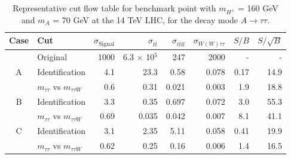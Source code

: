 \begin{table}
\centering
\begin{adjustwidth*}{0in}{-0.8in}
\caption{Representative cut flow table for benchmark point with $m_{H^{\pm}}$ = 160 GeV and $m_A$ = 70 GeV at the 14 TeV LHC, for the decay mode $A\rightarrow\tau\tau$.}
\begin{tabular}{clrrrrrr}
  \toprule
  Case    & Cut                                & $\sigma_\text{Signal}$ & $\sigma_{t\bar{t}}$ & $\sigma_{t\bar{t}ll}$ & $\sigma_{W(W)\tau\tau}$ & $S/B$ & $S/\sqrt{B}$	\\\midrule
          & Original                           & 1000                   & 6.3 $\times$ 10$^5$ & 247                   & 2000                    & -     & - \\\midrule
  A       & Identification                     & 4.1                    & 23.3                & 0.58                  & 0.078                   & 0.17  & 14.9		\\
          & $m_{\tau\tau}$ vs $m_{\tau\tau W}$ & 0.6                    & 0.31                & 0.021                 & 0.003                   & 1.9   & 18.8		\\\midrule
  B       & Identification                     & 3.3                    & 0.35                & 0.697                 & 0.072                   & 3.0   & 55.3		\\
          & $m_{\tau\tau}$ vs $m_{\tau\tau W}$ & 0.69                   & 0.035               & 0.042                 & 0.007                   & 8.1   & 41.1		\\\midrule
  C       & Identification                     & 3.1                    & 2.35                & 5.11                  & 0.058                   & 0.41  & 19.9		\\
          & $m_{\tau\tau}$ vs $m_{\tau\tau W}$ & 0.62                   & 0.25                & 0.16                  & 0.006                   & 1.4   & 16.5		\\\midrule
\end{tabular}
\label{tab:tt}
\end{adjustwidth*}
\end{table}

